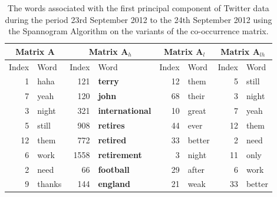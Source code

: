\documentclass[graybox]{svmult}
\newcommand{\covmat}{\mathbf{A}}
\begin{document}
\begin{table}[H]

\center
\begin{tabular}{| r | l | r | l| r | l | r | l|}
\hline
\multicolumn{2}{|c|}{Matrix $\covmat$ }& \multicolumn{2}{|c|}{Matrix $\covmat_h$}& \multicolumn{2}{|c|}{Matrix $\covmat_l$} & \multicolumn{2}{|c|}{Matrix $\covmat_{lh}$} \\

\hline
Index & Word &Index & Word & Index & Word & Index & Word\\
\hline
1 & haha & 121 & \textbf{terry} & 12 & them& 5 & still\\
7 & yeah  & 120 & \textbf{john} &68 & their &  3 & night\\
3 & night&321 & \textbf{international}& 10 & great  & 7 & yeah \\

5 & still & 908 & \textbf{retires}&44 & ever  & 12 & them \\

12 & them& 772 & \textbf{retired}&33 & better   & 2 & need\\

6 & work& 1558 & \textbf{retirement}  &3& night & 11 & only  \\ 

2 & need &66 & \textbf{football} & 29 & after & 6 & work\\
 
9 & thanks& 144 & \textbf{england}  & 21 & weak & 33 & better\\

\hline
\end{tabular}

\caption{The words associated with the first principal component of Twitter data during the period 23rd September 2012 to the 24th September 2012 using the Spannogram Algorithm on the variants of the co-occurrence matrix. }
\label{pcs_jterry}
\end{table}
\end{document}

